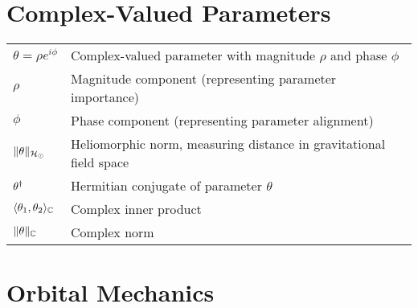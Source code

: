 \section*{Complex-Valued Parameters}
\vspace{-0.5em}
\begin{tabular}{p{3cm} p{12cm}}
$\theta = \rho e^{i\phi}$ & Complex-valued parameter with magnitude $\rho$ and phase $\phi$ \\
$\rho$ & Magnitude component (representing parameter importance) \\
$\phi$ & Phase component (representing parameter alignment) \\
$\|\theta\|_{\mathcal{H}_{\odot}}$ & Heliomorphic norm, measuring distance in gravitational field space \\
$\theta^{\dagger}$ & Hermitian conjugate of parameter $\theta$ \\
$\langle \theta_1, \theta_2 \rangle_{\mathbb{C}}$ & Complex inner product \\
$\|\theta\|_{\mathbb{C}}$ & Complex norm \\
\end{tabular}

\section*{Orbital Mechanics}

